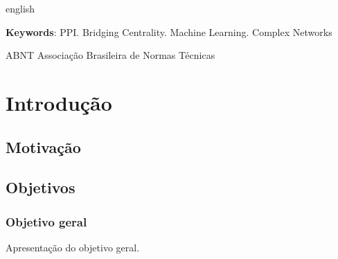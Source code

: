 \documentclass[
	12pt,				%
	twoside,			%
	a4paper,			%
	english,			%
	french,				%
	spanish,			%
	brazil				%
	]{abntex2}
\newcommand{\listasdousuario}{}
\begin{document}
\begin{resumo}[Abstract]
\begin{otherlanguage*}{english}
   \vspace{\onelineskip}
 
   \noindent 
   \textbf{Keywords}: PPI. Bridging Centrality. Machine Learning. Complex Networks
 \end{otherlanguage*}
\end{resumo}






\listasdousuario

\begin{siglas}
  \item[ABNT] Associação Brasileira de Normas Técnicas
\end{siglas}

\tableofcontents*
\cleardoublepage


\textual
\pagestyle{simple}                  %


\chapter{Introdução}\label{introduuxe7uxe3o}

\section{Motivação}\label{motivauxe7uxe3o}

\section{Objetivos}\label{objetivos}

\subsection{Objetivo geral}\label{objetivo-geral}

Apresentação do objetivo geral.
\end{document}
